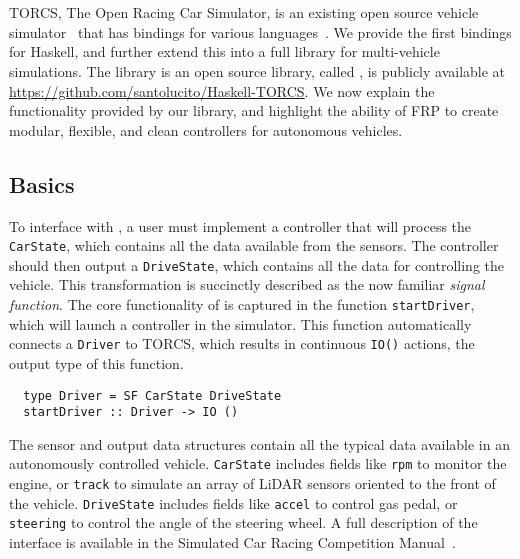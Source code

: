 \section{\ourLib}
TORCS, The Open Racing Car Simulator, is an existing open source vehicle simulator~\cite{torcs} that has bindings for various languages~\cite{SCRC}.
We provide the first bindings for Haskell, and further extend this into a full library for multi-vehicle simulations.
The library is an open source library, called \ourLib, is publicly available at \url{https://github.com/santolucito/Haskell-TORCS}.
We now explain the functionality provided by our library, and highlight the ability of FRP to create modular, flexible, and clean controllers for autonomous vehicles.

\subsection{Basics}

To interface with \ourLib, a user must implement a controller that will process the \texttt{CarState}, which contains all the data available from the sensors.
The controller should then output a \texttt{DriveState}, which contains all the data for controlling the vehicle.
This transformation is succinctly described as the now familiar \textit{signal function}.
The core functionality of \ourLib is captured in the function \texttt{startDriver}, which will launch a controller in the simulator.
This function automatically connects a \texttt{Driver} to TORCS, which results in continuous \texttt{IO()} actions, the output type of this function.

\vspace{0.2em}
\begin{lstlisting}
  type Driver = SF CarState DriveState
  startDriver :: Driver -> IO ()
\end{lstlisting}
\vspace{0.2em}

\noindent The sensor and output data structures contain all the typical data available in an autonomously controlled vehicle.
\texttt{CarState} includes fields like \texttt{rpm} to monitor the engine, or \texttt{track} to simulate an array of LiDAR sensors oriented to the front of the vehicle.
\texttt{DriveState} includes fields like \texttt{accel} to control gas pedal, or \texttt{steering} to control the angle of the steering wheel.
A full description of the interface is available in the Simulated Car Racing Competition Manual~\cite{SCRCManual}. 

